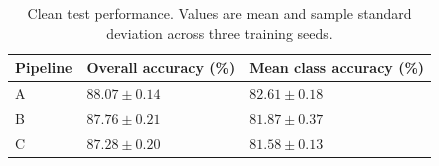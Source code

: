 \begin{table}[!ht]\centering
\begin{tabular}{lll}
\toprule Pipeline & Overall accuracy (\%) & Mean class accuracy (\%)\\\midrule
A & $88.07 \pm 0.14$ & $82.61 \pm 0.18$\\
B & $87.76 \pm 0.21$ & $81.87 \pm 0.37$\\
C & $87.28 \pm 0.20$ & $81.58 \pm 0.13$\\
\bottomrule\end{tabular}
\caption{Clean test performance. Values are mean and sample standard deviation across three training seeds.}\end{table}